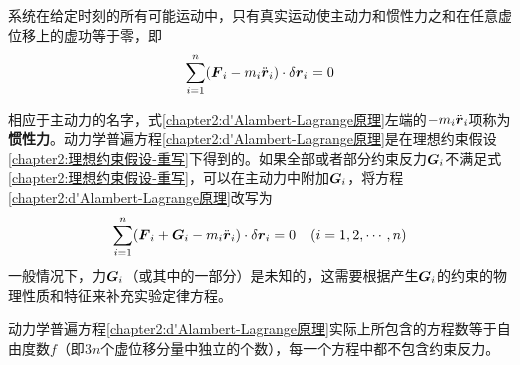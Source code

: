 \begin{theorem}
	系统在给定时刻的所有可能运动中，只有真实运动使主动力和惯性力之和在任意虚位移上的虚功等于零，即
	\begin{equation}
		\sum_{i=1}^n(\boldsymbol{F}_i - m_i \ddot{\boldsymbol{r}}_i) \cdot \delta \boldsymbol{r}_i = 0
		\label{chapter2:d'Alambert-Lagrange原理}
	\end{equation}
\end{theorem}

相应于主动力的名字，式\eqref{chapter2:d'Alambert-Lagrange原理}左端的$-m_i\ddot{\boldsymbol{r}}_i$项称为{\bf 惯性力}。动力学普遍方程\eqref{chapter2:d'Alambert-Lagrange原理}是在理想约束假设\eqref{chapter2:理想约束假设-重写}下得到的。如果全部或者部分约束反力$\boldsymbol{G}_i$不满足式\eqref{chapter2:理想约束假设-重写}，可以在主动力中附加$\boldsymbol{G}_i$，将方程\eqref{chapter2:d'Alambert-Lagrange原理}改写为
\begin{equation}
	\sum_{i=1}^n (\boldsymbol{F}_i+\boldsymbol{G}_i-m_i\ddot{\boldsymbol{r}}_i)\cdot \delta \boldsymbol{r}_i = 0\quad (i=1,2,\cdots,n)
	\label{chapter2:考虑了非理想约束的d'Alambert-Lagrange原理}
\end{equation}
一般情况下，力$\boldsymbol{G}_i$（或其中的一部分）是未知的，这需要根据产生$\boldsymbol{G}_i$的约束的物理性质和特征来补充实验定律方程。

动力学普遍方程\eqref{chapter2:d'Alambert-Lagrange原理}实际上所包含的方程数等于自由度数$f$（即$3n$个虚位移分量中独立的个数），每一个方程中都不包含约束反力。

